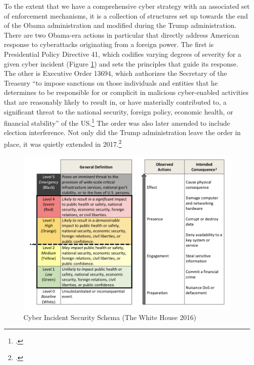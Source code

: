 \documentclass{memoir}
\begin{document}
\begin{refsegment}
To the extent that we have a comprehensive cyber strategy with an associated set of enforcement mechanisms, it is a collection of structures set up towards the end of the Obama administration and modified during the Trump administration. There are two Obama-era actions in particular that directly address American response to cyberattacks originating from a foreign power. The first is Presidential Policy Directive 41, which codifies varying degrees of severity for a given cyber incident (Figure \ref{severity-schema}) and sets the principles that guide its response. The other is Executive Order 13694, which authorizes the Secretary of the Treasury ``to impose sanctions on those individuals and entities that he determines to be responsible for or complicit in malicious cyber-enabled activities that are reasonably likely to result in, or have materially contributed to, a significant threat to the national security, foreign policy, economic health, or financial stability'' of the US.\footcite{daniel_our_2015} The order was also later amended to include election interference. Not only did the Trump administration leave the order in place, it was quietly extended in 2017.\footcite{uchill_white_2017}

\begin{figure}
\centering
\includegraphics[scale=0.53]{severity-schema.png}
\caption{Cyber Incident Security Schema (The White House 2016)}
\label{severity-schema}
\end{figure}


\end{refsegment}
\end{document}

